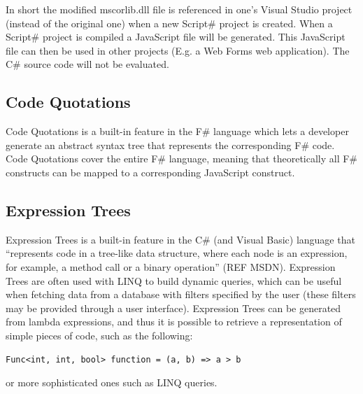 		In short the modified mscorlib.dll file is referenced in one's Visual Studio project (instead of the original one) when a new Script\# project is created. When a Script\# project is compiled a JavaScript file will be generated. This JavaScript file can then be used in other projects (E.g. a Web Forms web application). The C\# source code will not be evaluated.




	\subsection{Code Quotations} %
	\label{ssub:code_quotations}
		Code Quotations is a built-in feature in the F\# language which lets a developer generate an abstract syntax tree that represents the corresponding F\# code. Code Quotations cover the entire F\# language, meaning that theoretically all F\# constructs can be mapped to a corresponding JavaScript construct.


	\subsection{Expression Trees} %
	\label{ssub:expression_trees}
			Expression Trees is a built-in feature in the C\# (and Visual Basic) language that “represents code in a tree-like data structure, where each node is an expression, for example, a method call or a binary operation” (REF MSDN). Expression Trees are often used with LINQ to build dynamic queries, which can be useful when fetching data from a database with filters specified by the user (these filters may be provided through a user interface). Expression Trees can be generated from lambda expressions, and thus it is possible to retrieve a representation of simple pieces of code, such as the following:

			\begin{lstlisting}[language=CSharp,classoffset=1,morekeywords={Func}]
				Func<int, int, bool> function = (a, b) => a > b
			\end{lstlisting}

			or more sophisticated ones such as LINQ queries. 

